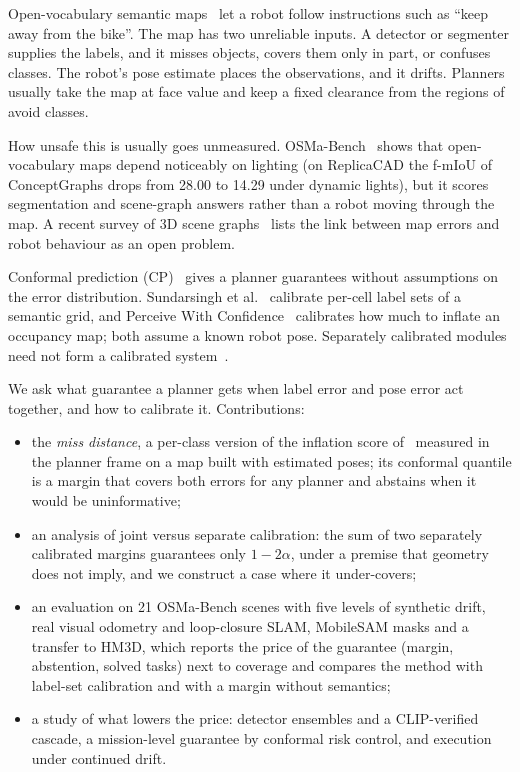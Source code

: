 \documentclass[conference]{IEEEtran}
\theoremstyle{definition}
\begin{document}
Open-vocabulary semantic maps~\cite{conceptgraphs} let a robot follow instructions such as ``keep away from the
bike''. The map has two unreliable inputs. A detector or segmenter supplies the labels, and it misses objects,
covers them only in part, or confuses classes. The robot's pose estimate places the observations, and it drifts.
Planners usually take the map at face value and keep a fixed clearance from the regions of avoid classes.

How unsafe this is usually goes unmeasured. OSMa-Bench~\cite{osmabench} shows that open-vocabulary maps depend
noticeably on lighting (on ReplicaCAD the f-mIoU of ConceptGraphs drops from 28.00 to 14.29 under dynamic lights), but it scores segmentation and
scene-graph answers rather than a robot moving through the map. A recent survey of 3D scene graphs~\cite{survey3dsg}
lists the link between map errors and robot behaviour as an open problem.

Conformal prediction (CP)~\cite{gentle} gives a planner guarantees without assumptions on the error distribution.
Sundarsingh et al.~\cite{sundarsingh} calibrate per-cell label sets of a semantic grid, and Perceive With
Confidence~\cite{pwc} calibrates how much to inflate an occupancy map; both assume a known robot pose. Separately
calibrated modules need not form a calibrated system~\cite{baral}.

We ask what guarantee a planner gets when label error and pose error act together, and how to calibrate it.
Contributions:
\begin{itemize}
  \item the \emph{miss distance}, a per-class version of the inflation score of~\cite{pwc} measured in the planner frame
  on a map built with estimated poses; its conformal quantile is a margin that covers both errors for any planner and
  abstains when it would be uninformative;
  \item an analysis of joint versus separate calibration: the sum of two separately calibrated margins guarantees only
  $1 - 2\alpha$, under a premise that geometry does not imply, and we construct a case where it under-covers;
  \item an evaluation on 21 OSMa-Bench scenes with five levels of synthetic drift, real visual odometry and loop-closure
  SLAM, MobileSAM masks and a transfer to HM3D, which reports the price of the guarantee (margin, abstention, solved
  tasks) next to coverage and compares the method with label-set calibration and with a margin without semantics;
  \item a study of what lowers the price: detector ensembles and a CLIP-verified cascade, a mission-level guarantee by
  conformal risk control, and execution under continued drift.
\end{itemize}
\end{document}

